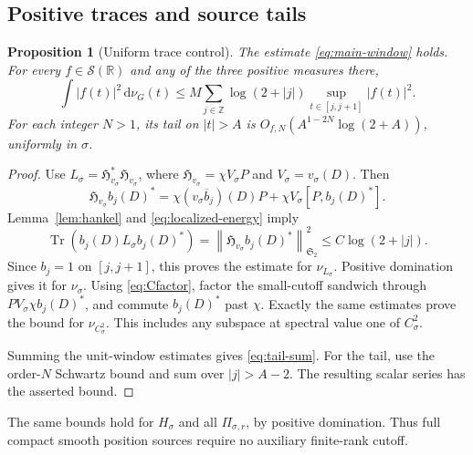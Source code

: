 \documentclass[11pt]{article}
\numberwithin{equation}{section}
\newtheorem{proposition}[theorem]{Proposition}
\theoremstyle{definition}
\theoremstyle{remark}
\newcommand{\Sch}{\mathcal S}
\newcommand{\Tr}{\operatorname{Tr}}
\newcommand{\Stwo}{\mathfrak S_2}
\newcommand{\norm}[1]{\left\lVert #1\right\rVert}
\newcommand{\dd}{\,\mathrm d}
\begin{document}
\subsection{Positive traces and source tails}

\begin{proposition}[Uniform trace control]\label{prop:tails}
The estimate \eqref{eq:main-window} holds. For every
\(f\in\Sch(\mathbb R)\) and any of the three positive measures there,
\begin{equation}\label{eq:tail-sum}
\int |f(t)|^2\dd\nu_G(t)
\le M\sum_{j\in\mathbb Z}
\log(2+|j|)\sup_{t\in[j,j+1]}|f(t)|^2.
\end{equation}
For each integer \(N>1\), its tail on \(|t|>A\) is
\(O_{f,N}(A^{1-2N}\log(2+A))\), uniformly in \(\sigma\).
\end{proposition}
\begin{proof}
Use \(L_\sigma=\mathfrak H_{v_\sigma}^*\mathfrak H_{v_\sigma}\),
where \(\mathfrak H_{v_\sigma}=\chi V_\sigma P\) and
\(V_\sigma=v_\sigma(D)\). Then
\[
\mathfrak H_{v_\sigma}b_j(D)^*
=\chi(v_\sigma\overline b_j)(D)P+
\chi V_\sigma[P,b_j(D)^*].
\]
Lemma~\ref{lem:hankel} and \eqref{eq:localized-energy} imply
\[
\Tr(b_j(D)L_\sigma b_j(D)^*)
=\norm{\mathfrak H_{v_\sigma}b_j(D)^*}_{\Stwo}^2
\le C\log(2+|j|).
\]
Since \(b_j=1\) on \([j,j+1]\), this proves the estimate for
\(\nu_{L_\sigma}\). Positive domination gives it for \(\nu_\sigma\).
Using \eqref{eq:Cfactor}, factor the small-cutoff sandwich through
\(PV_\sigma\chi b_j(D)^*\), and commute \(b_j(D)^*\) past
\(\chi\). Exactly the same estimates prove the bound for
\(\nu_{C_\sigma^2}\). This includes any subspace at spectral
value one of \(C_\sigma^2\).

Summing the unit-window estimates gives \eqref{eq:tail-sum}.
For the tail, use the order-\(N\) Schwartz bound and sum over
\(|j|>A-2\). The resulting scalar series has the asserted bound.
\end{proof}

The same bounds hold for \(H_\sigma\) and all \(\Pi_{\sigma,r}\),
by positive domination. Thus full compact smooth position sources
require no auxiliary finite-rank cutoff.
\end{document}
